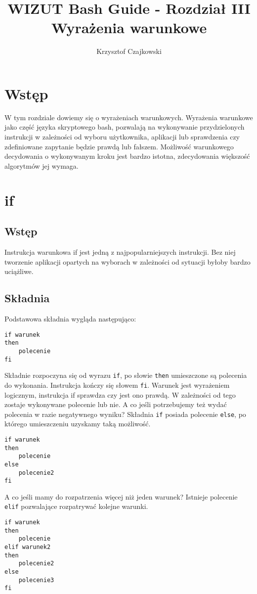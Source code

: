 \documentclass[10 pt, a4paper]{article}
\author{Krzysztof Czajkowski}
\title{WIZUT Bash Guide - Rozdział III\\
Wyrażenia warunkowe}
\begin{document}
\maketitle
\tableofcontents
\newpage

\section{Wstęp}
W tym rozdziale dowiemy się o wyrażeniach warunkowych. Wyrażenia warunkowe jako część języka skryptowego bash, pozwalają na wykonywanie przydzielonych instrukcji w zależności od wyboru użytkownika, aplikacji lub sprawdzenia czy zdefiniowane zapytanie będzie prawdą lub fałszem. Możliwość warunkowego decydowania o wykonywanym kroku jest bardzo istotna, zdecydowania większość algorytmów jej wymaga.
\section{if}
\subsection{Wstęp}
Instrukcja warunkowa if jest jedną z najpopularniejszych instrukcji. Bez niej tworzenie aplikacji opartych na wyborach w zależności od sytuacji byłoby bardzo uciążliwe.
\subsection{Składnia}
Podstawowa składnia wygląda następująco:
\begin{lstlisting}
if warunek
then
	polecenie
fi
\end{lstlisting}
Składnie rozpoczyna się od wyrazu \texttt{if}, po słowie \texttt{then} umieszczone są polecenia do wykonania. Instrukcja kończy się słowem \texttt{fi}. Warunek jest wyrażeniem logicznym, instrukcja if sprawdza czy jest ono prawdą. W zależności od tego zostaje wykonywane polecenie lub nie.\newline
A co jeśli potrzebujemy też wydać polecenia w razie negatywnego wyniku? Składnia \texttt{if} posiada polecenie \texttt{else}, po którego umieszczeniu uzyskamy taką możliwość.
\begin{lstlisting}
if warunek
then
	polecenie
else
	polecenie2
fi
\end{lstlisting}
A co jeśli mamy do rozpatrzenia więcej niż jeden warunek? Istnieje polecenie \texttt{elif} pozwalające rozpatrywać kolejne warunki.
\begin{lstlisting}
if warunek
then
	polecenie
elif warunek2
then
	polecenie2
else
	polecenie3
fi
\end{lstlisting}
\end{document}
